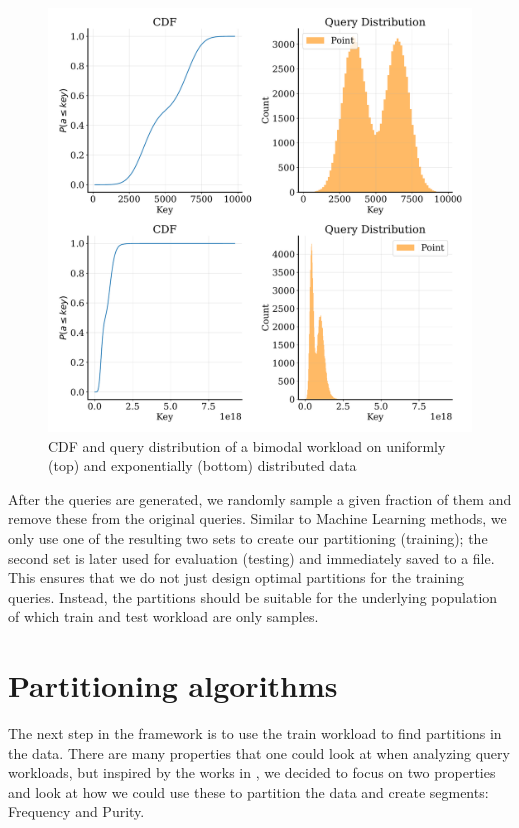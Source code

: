 \begin{figure}
    \centering
    \includegraphics[width=\textwidth]{figures/bimodal.pdf}
    \caption[uniform and exponential query distributions after bimodal sampling]{CDF and query distribution of a bimodal workload on uniformly (top) and exponentially (bottom) distributed data}
    \label{fig:bimodal}
\end{figure}

After the queries are generated, we randomly sample a given fraction of them and remove these from the original queries. Similar to Machine Learning methods, we only use one of the resulting two sets to create our partitioning (training); the second set is later used for evaluation (testing) and immediately saved to a file. This ensures that we do not just design optimal partitions for the training queries. Instead, the partitions should be suitable for the underlying population of which train and test workload are only samples.

\section{Partitioning algorithms}
The next step in the framework is to use the train workload to find partitions in the data. There are many properties that one could look at when analyzing query workloads, but inspired by the works in , we decided to focus on two properties and look at how we could use these to partition the data and create segments: Frequency and Purity.


